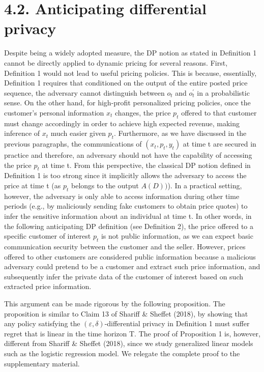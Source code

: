 \section{4.2. Anticipating differential privacy}\label{anticipating-differential-privacy}

Despite being a widely adopted measure, the DP notion as stated in Definition 1 cannot be directly applied to dynamic pricing for several reasons. First, Definition 1 would not lead to useful pricing policies. This is because, essentially, Definition 1 requires that conditioned on the output of the entire posted price sequence, the adversary cannot distinguish between \(o _ { t }\) and \(o _ { t } ^ { \prime }\) in a probabilistic sense. On the other hand, for high-profit personalized pricing policies, once the customer's personal information \(x _ { t }\) changes, the price \(p _ { t }\) offered to that customer must change accordingly in order to achieve high expected revenue, making inference of \(x _ { t }\) much easier given \(p _ { t }\). Furthermore, as we have discussed in the previous paragraphs, the communications of \(( x _ { t } , p _ { t } , y _ { t } )\) at time t are secured in practice and therefore, an adversary should not have the capability of accessing the price \(p _ { t }\) at time t. From this perspective, the classical DP notion defined in Definition 1 is too strong since it implicitly allows the adversary to access the price at time t (as \(p _ { t }\) belongs to the output \(A ( D ) )\)). In a practical setting, however, the adversary is only able to access information during other time periods (e.g., by maliciously sending fake customers to obtain price quotes) to infer the sensitive information about an individual at time t. In other words, in the following anticipating DP definition (see Definition 2), the price offered to a specific customer of interest \(p _ { t }\) is not public information, as we can expect basic communication security between the customer and the seller. However, prices offered to other customers are considered public information because a malicious adversary could pretend to be a customer and extract such price information, and subsequently infer the private data of the customer of interest based on such extracted price information.

This argument can be made rigorous by the following proposition. The proposition is similar to Claim 13 of Shariff \& Sheffet (2018), by showing that any policy satisfying the \(( \varepsilon , \delta )\)-differential privacy in Definition 1 must suffer regret that is linear in the time horizon T. The proof of Proposition 1 is, however, different from Shariff \& Sheffet (2018), since we study generalized linear models such as the logistic regression model. We relegate the complete proof to the supplementary material.

